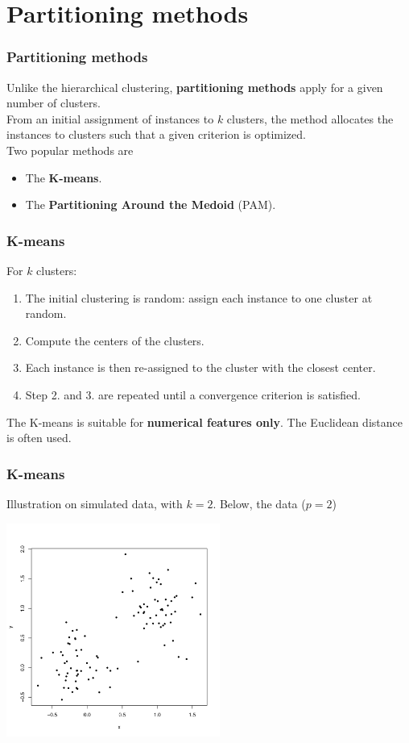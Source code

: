 \section{Partitioning methods}
\begin{frame}
\frametitle{Partitioning methods}
Unlike the hierarchical clustering, {\bf partitioning methods} apply for a given number of clusters. \\
\vspace{0.3cm}
From an initial assignment of instances to $k$ clusters, the method allocates the instances to clusters such that a given criterion is optimized. \\
\vspace{0.3cm}
Two popular methods are 
\begin{itemize}
\item The {\bf K-means}.
\item The {\bf Partitioning Around the Medoid} (PAM). 
\end{itemize}
\end{frame}
\begin{frame}
\frametitle{K-means}
For $k$ clusters:
\begin{enumerate}
\item The initial clustering is random: assign each instance to one cluster at random.
\item Compute the centers of the clusters. 
\item Each instance is then re-assigned to the cluster with the closest center.
\item Step 2. and 3. are repeated until a convergence criterion is satisfied.
\end{enumerate}
The K-means is suitable for {\bf numerical features only}. The Euclidean distance is often used.
\end{frame}
\begin{frame}
\frametitle{K-means}
Illustration on simulated data, with $k=2$. Below, the data ($p=2$)
\begin{center}
\includegraphics[width=7cm]{../../Graphs/kmeans1.png}
\end{center}
\end{frame}
